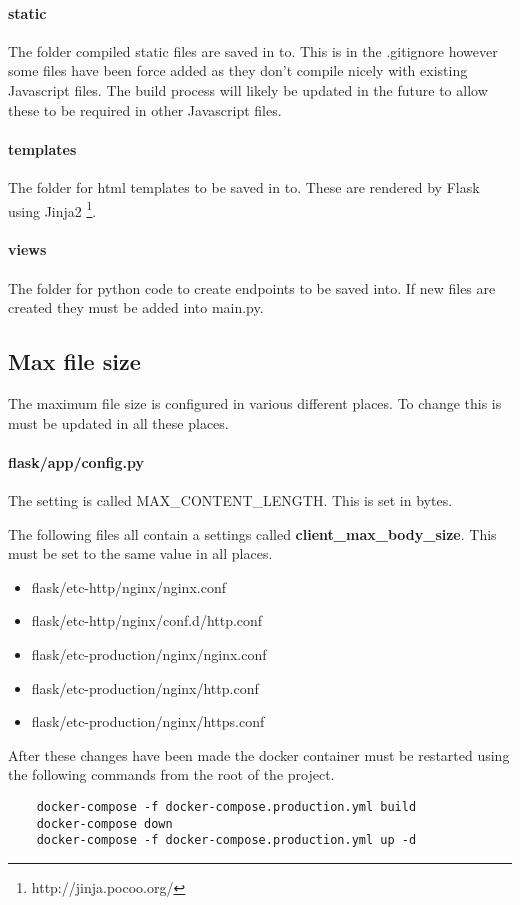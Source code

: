 \paragraph{static}  The folder compiled static files are saved in to.  This is in the .gitignore however some files have been force added as they don't compile nicely with existing Javascript files.  The build process will likely be updated in the future to allow these to be required in other Javascript files.

\paragraph{templates}  The folder for html templates to be saved in to.  These are rendered by Flask using Jinja2 \footnote{http://jinja.pocoo.org/}.

\paragraph{views}  The folder for python code to create endpoints to be saved into.  If new files are created they must be added into main.py.

\subsection{Max file size}

The maximum file size is configured in various different places.  To change this is must be updated in all these places.

\paragraph{flask/app/config.py}  The setting is called MAX\_CONTENT\_LENGTH.  This is set in bytes.

The following files all contain a settings called \textbf{client\_max\_body\_size}.  This must be set to the same value in all places.

\begin{itemize}
	\item flask/etc-http/nginx/nginx.conf
	\item flask/etc-http/nginx/conf.d/http.conf
	\item flask/etc-production/nginx/nginx.conf
	\item flask/etc-production/nginx/http.conf
	\item flask/etc-production/nginx/https.conf
\end{itemize}

After these changes have been made the docker container must be restarted using the following commands from the root of the project.

\begin{verbatim}
	docker-compose -f docker-compose.production.yml build
	docker-compose down
	docker-compose -f docker-compose.production.yml up -d
\end{verbatim}
